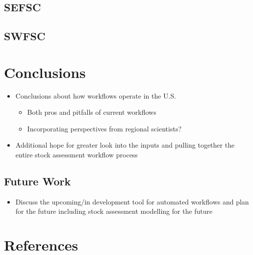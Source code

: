 \documentclass[
  letterpaper,
  DIV=11,
  numbers=noendperiod]{scrreprt}
\providecommand{\tightlist}{%
  \setlength{\itemsep}{0pt}\setlength{\parskip}{0pt}}\usepackage{longtable,booktabs,array}
\newlength{\cslhangindent}
\newenvironment{CSLReferences}[2] %
 {\begin{list}{}{%
  \setlength{\itemindent}{0pt}
  \setlength{\leftmargin}{0pt}
  \setlength{\parsep}{0pt}
  \ifodd #1
   \setlength{\leftmargin}{\cslhangindent}
   \setlength{\itemindent}{-1\cslhangindent}
  \fi
  \setlength{\itemsep}{#2\baselineskip}}}
 {\end{list}}
\begin{document}
\section{SEFSC}\label{sec-sefsc}

\section{SWFSC}\label{sec-swfsc}


\chapter{Conclusions}\label{conclusions}

\begin{itemize}
\item
  Conclusions about how workflows operate in the U.S.

  \begin{itemize}
  \item
    Both pros and pitfalls of current workflows
  \item
    Incorporating perspectives from regional scientists?
  \end{itemize}
\item
  Additional hope for greater look into the inputs and pulling together
  the entire stock assessment workflow process
\end{itemize}

\section{Future Work}\label{future-work}

\begin{itemize}
\tightlist
\item
  Discuss the upcoming/in development tool for automated workflows and
  plan for the future including stock assessment modelling for the
  future
\end{itemize}


\chapter*{References}\label{references}


\label{refs}
\begin{CSLReferences}{0}{1}
\end{CSLReferences}
\end{document}
